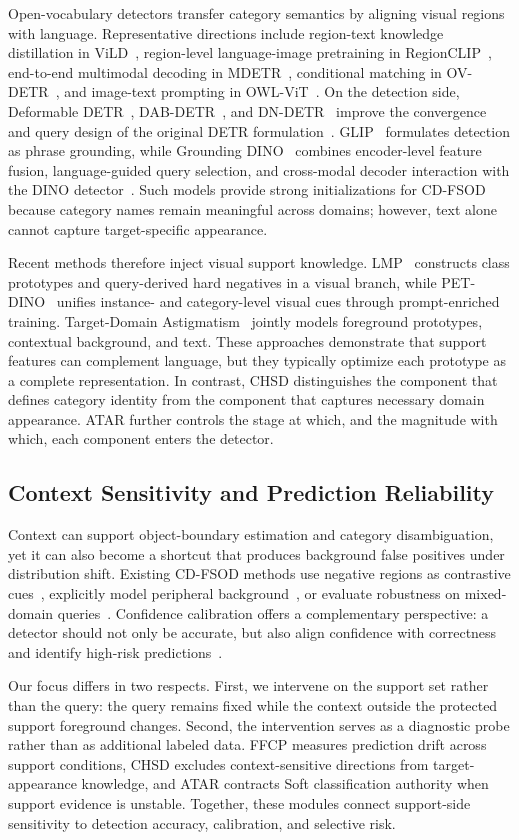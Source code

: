 Open-vocabulary detectors transfer category semantics by aligning visual regions with language. Representative directions include region-text knowledge distillation in ViLD~\cite{vild}, region-level language-image pretraining in RegionCLIP~\cite{regionclip}, end-to-end multimodal decoding in MDETR~\cite{mdetr}, conditional matching in OV-DETR~\cite{ovdetr}, and image-text prompting in OWL-ViT~\cite{owlvit}. On the detection side, Deformable DETR~\cite{deformable_detr}, DAB-DETR~\cite{dab_detr}, and DN-DETR~\cite{dn_detr} improve the convergence and query design of the original DETR formulation~\cite{detr}. GLIP~\cite{glip} formulates detection as phrase grounding, while Grounding DINO~\cite{groundingdino} combines encoder-level feature fusion, language-guided query selection, and cross-modal decoder interaction with the DINO detector~\cite{dino}. Such models provide strong initializations for CD-FSOD because category names remain meaningful across domains; however, text alone cannot capture target-specific appearance.

Recent methods therefore inject visual support knowledge. LMP~\cite{lmp} constructs class prototypes and query-derived hard negatives in a visual branch, while PET-DINO~\cite{petdino} unifies instance- and category-level visual cues through prompt-enriched training. Target-Domain Astigmatism~\cite{astigmatism} jointly models foreground prototypes, contextual background, and text. These approaches demonstrate that support features can complement language, but they typically optimize each prototype as a complete representation. In contrast, CHSD distinguishes the component that defines category identity from the component that captures necessary domain appearance. ATAR further controls the stage at which, and the magnitude with which, each component enters the detector.

\subsection{Context Sensitivity and Prediction Reliability}

Context can support object-boundary estimation and category disambiguation, yet it can also become a shortcut that produces background false positives under distribution shift. Existing CD-FSOD methods use negative regions as contrastive cues~\cite{lmp}, explicitly model peripheral background~\cite{astigmatism}, or evaluate robustness on mixed-domain queries~\cite{yu2026}. Confidence calibration offers a complementary perspective: a detector should not only be accurate, but also align confidence with correctness and identify high-risk predictions~\cite{calibration,selective}.

Our focus differs in two respects. First, we intervene on the support set rather than the query: the query remains fixed while the context outside the protected support foreground changes. Second, the intervention serves as a diagnostic probe rather than as additional labeled data. FFCP measures prediction drift across support conditions, CHSD excludes context-sensitive directions from target-appearance knowledge, and ATAR contracts Soft classification authority when support evidence is unstable. Together, these modules connect support-side sensitivity to detection accuracy, calibration, and selective risk.
